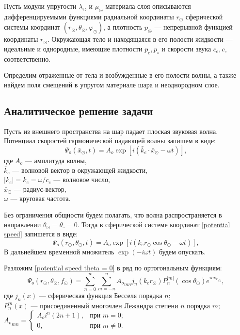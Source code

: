 Пусть модули упругости $\lambda_\circledcirc$ и $\mu_\circledcirc$ материала слоя описываются дифференцируемыми функциями радиальной координаты $r_\odot$ сферической системы координат $(r_\odot, \theta_\odot, \varphi_\odot)$, а плотность $p_\circledcirc$ --- непрерывной функцией координаты $r_\odot$.  Окружающая тело и находящаяся в его полости жидкости --- идеальные и однородные, имеющие плотности $p_e, p_\circ$ и скорости звука $c_e, c_\circ$ соответственно. 

Определим отраженные от тела и возбужденные в его полости волны, а также найдем поля смещений в упругом материале шара и неоднородном слое.


\newpage
\subsection{Аналитическое решение задачи}

Пусть из внешнего пространства на шар падает плоская звуковая волна. Потенциал скоростей гармонической падающей волны запишем в виде:
\begin{equation}\label{potential speed}
\Psi_o(\bar{x}_\odot, t) = A_o \exp\left[i\left(\bar{k}_e\!\cdot\!\bar{x}_\odot-\omega t\right)\right],
\end{equation}
где $A_o$ --- амплитуда волны, \\
$\bar{k}_e$ --- волновой вектор в окружающей жидкости,  \\
$\lvert\bar{k}_e\rvert = k_e = \omega / c_e$ --- волновое число, \\
$\bar{x}_\odot$ --- радиус-вектор, \\
$\omega$ --- круговая частота.

 Без ограничения общности будем полагать, что волна распространяется в направлении $\theta_\odot = \theta_\circ = 0$. Тогда в сферической системе координат \eqref{potential speed} запишется в виде:
\begin{equation}\label{potential speed theta = 0}
\Psi_o(r_\odot, \theta_\odot, t) = A_o \exp\left[i\left(k_e r_\odot\cos\theta_\odot - \omega t\right)\right],
\end{equation}
В дальнейшем временной множитель $\exp(-i\omega t)$ будем опускать.

Разложим \eqref{potential speed theta = 0} в ряд по ортогональным функциям:
\begin{equation}
\Psi_o(r_\odot, \theta_\odot, f_\odot) = \sum\limits_{n=0}^\infty\sum\limits_{m=-n}^n {A_o}_{mn}j_n(k_e r_\odot)P_n^{\lvert m\rvert}(\cos\theta_\odot) e^{im\varphi_\odot},
\end{equation}
где $j_n(x)$ --- сферическая функция Бесселя порядка $n;$\\
$P_n^m(x)$ --- присоединенный многочлен Лежандра степени $n$ порядка $m;$\\
${A_o}_{mn} = 
\begin{cases}
A_o i^n(2n+1),& \text{при } m=0;\\
0,& \text{при } m \ne 0.
\end{cases}
$

